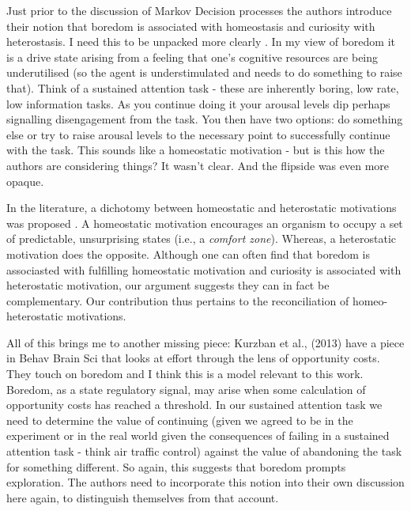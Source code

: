 \documentclass[utf8]{article}
\newenvironment{reply}  
    {\color{Blue}\noindent\newline}
    {\newline}
\begin{document}
        Just prior to the discussion of Markov Decision processes the authors introduce their notion that boredom is associated with homeostasis and curiosity with heterostasis. I need this to be unpacked more clearly . In my view of boredom it is a drive state arising from a feeling that one's cognitive resources are being underutilised (so the agent is understimulated and needs to do something to raise that). Think of a sustained attention task - these are inherently boring, low rate, low information tasks. As you continue doing it your arousal levels dip perhaps signalling disengagement from the task. You then have two options: do something else or try to raise arousal levels to the necessary point to successfully continue with the task. This sounds like a homeostatic motivation - but is this how the authors are considering things? It wasn't clear. And the flipside was even more opaque. 
        
        
        \begin{reply}
            In the literature, a dichotomy between homeostatic and heterostatic motivations was proposed \citep{intrinsicmotiv}. A homeostatic motivation encourages an organism to occupy a set of predictable, unsurprising states (i.e., a {\it comfort zone}). Whereas, a heterostatic motivation does the opposite. Although one can often find that boredom is associasted with fulfilling homeostatic motivation and curiosity is associated with heterostatic motivation, our argument suggests they can in fact be complementary. Our contribution thus pertains to the reconciliation of homeo-heterostatic motivations.
        \end{reply}
        
        
        
        All of this brings me to another missing piece: Kurzban  et al., (2013) have a piece in Behav Brain Sci that looks at effort through the lens of opportunity costs. They touch on boredom and I think this is a model relevant to this work. Boredom, as a state regulatory signal, may arise when some calculation of opportunity costs has reached a threshold. In our sustained attention task we need to determine the value of continuing (given we agreed to be in the experiment or in the real world given the consequences of failing in a sustained attention task - think air traffic control) against the value of abandoning the task for something different. So again, this suggests that boredom prompts exploration. The authors need to incorporate this notion into their own discussion here again, to distinguish themselves from that account.  
        
\end{document}
